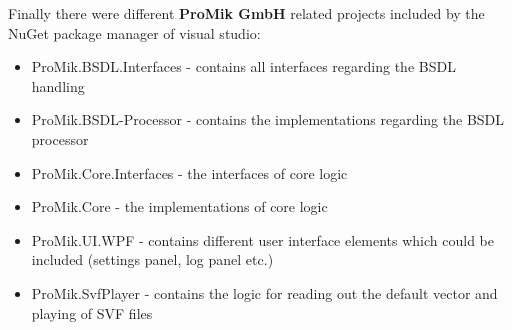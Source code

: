 Finally there were different \textbf{ProMik GmbH} related projects included by the NuGet package manager of visual studio:
\begin{itemize}
	\item ProMik.BSDL.Interfaces - contains all interfaces regarding the BSDL handling
	\item ProMik.BSDL-Processor - contains the implementations regarding the BSDL processor
	\item ProMik.Core.Interfaces - the interfaces of core logic
	\item ProMik.Core - the implementations of core logic
	\item ProMik.UI.WPF - contains different user interface elements which could be included (settings panel, log panel \ac{etc.})
	\item ProMik.SvfPlayer - contains the logic for reading out the default vector and playing of \ac{SVF} files
\end{itemize}

